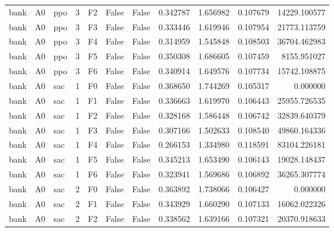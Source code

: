 \begin{tabular}{lllrlllrrrr}
      bank &      A0 &       ppo &     3 &  F2 &           False &            False &  0.342787 &  1.656982 & 0.107679 &     14229.100577 \\
      bank &      A0 &       ppo &     3 &  F3 &           False &            False &  0.333446 &  1.619946 & 0.107954 &     21773.113759 \\
      bank &      A0 &       ppo &     3 &  F4 &           False &            False &  0.314959 &  1.545848 & 0.108503 &     36704.462983 \\
      bank &      A0 &       ppo &     3 &  F5 &           False &            False &  0.350308 &  1.686605 & 0.107459 &      8155.951027 \\
      bank &      A0 &       ppo &     3 &  F6 &           False &            False &  0.340914 &  1.649576 & 0.107734 &     15742.108875 \\
      bank &      A0 &       sac &     1 &  F0 &           False &            False &  0.368650 &  1.744269 & 0.105317 &         0.000000 \\
      bank &      A0 &       sac &     1 &  F1 &           False &            False &  0.336663 &  1.619970 & 0.106443 &     25955.726535 \\
      bank &      A0 &       sac &     1 &  F2 &           False &            False &  0.328168 &  1.586448 & 0.106742 &     32839.640379 \\
      bank &      A0 &       sac &     1 &  F3 &           False &            False &  0.307166 &  1.502633 & 0.108540 &     49860.164336 \\
      bank &      A0 &       sac &     1 &  F4 &           False &            False &  0.266153 &  1.334980 & 0.118591 &     83104.226181 \\
      bank &      A0 &       sac &     1 &  F5 &           False &            False &  0.345213 &  1.653490 & 0.106143 &     19028.148437 \\
      bank &      A0 &       sac &     1 &  F6 &           False &            False &  0.323941 &  1.569686 & 0.106892 &     36265.307774 \\
      bank &      A0 &       sac &     2 &  F0 &           False &            False &  0.363892 &  1.738066 & 0.106427 &         0.000000 \\
      bank &      A0 &       sac &     2 &  F1 &           False &            False &  0.343929 &  1.660290 & 0.107133 &     16062.022326 \\
      bank &      A0 &       sac &     2 &  F2 &           False &            False &  0.338562 &  1.639166 & 0.107321 &     20370.918633 \\

\end{tabular}
